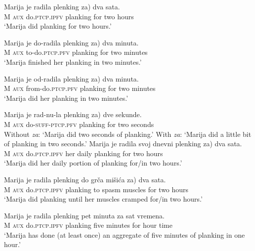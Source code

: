 \documentclass[output=paper]{langscibook}
\begin{document}
\ea\label{ars:ex:QPbound}
		\begin{xlist}
	
	    \ex  \gll Marija je radila plenking  za) dva sata.\\ 
        M \textsc{aux} do\textsc{.ptcp.ipfv} planking {} for two hours \\ 
        \glt `Marija did planking for two hours.'\label{ars:ex:QPbounda}
        
        \ex  \gll Marija je do-radila plenking  za) dva minuta.\\ 
        M \textsc{aux} to-do\textsc{.ptcp.pfv} planking {} for two minutes \\ 
        \glt `Marija finished her planking in two minutes.'\label{ars:ex:QPboundb}
	    
        \ex  \gll Marija je od-radila plenking  za) dva minuta.\\ 
        M \textsc{aux} from-do\textsc{.ptcp.pfv} planking {} for two minutes \\ 
        \glt `Marija did her planking in two minutes.'\label{ars:ex:QPboundb1}
	
	    \ex  \gll Marija je rad-nu-la plenking \minsp{(} za) dve sekunde.\\ 
        M \textsc{aux} do\textsc{-suff-ptcp.pfv} planking {} for two seconds \\ \label{ars:ex:QPboundc}
        \ea Without \textit{za}: `Marija did two seconds of planking.' 
        \ex With \textit{za}: `Marija did a little bit of planking in two seconds.'
        \z
       \ex  \gll Marija je radila  svoj dnevni plenking \minsp{(} za) dva sata.\\ 
        M \textsc{aux} do\textsc{.ptcp.ipfv} her daily planking {} for two hours \\ 
        \glt `Marija did her daily portion of planking for\slash in two hours.'\label{ars:ex:QPboundd}
        
       \ex  \gll Marija je radila  plenking do grča mišića \minsp{(} za) dva sata.\\ 
        M \textsc{aux} do\textsc{.ptcp.ipfv} planking to spasm muscles {} for two hours \\ 
        \glt `Marija did planking until her muscles cramped for\slash in two hours.'\label{ars:ex:QPboundd1}

	    \ex  \gll Marija je radila plenking pet minuta za sat vremena.\\ 
        M \textsc{aux} do\textsc{.ptcp.ipfv} planking five minutes for hour time \\ 
        \glt `Marija has done (at least once) an aggregate of five minutes of planking in one hour.'\label{ars:ex:QPbounde}

       	\end{xlist}
\z
\end{document}

